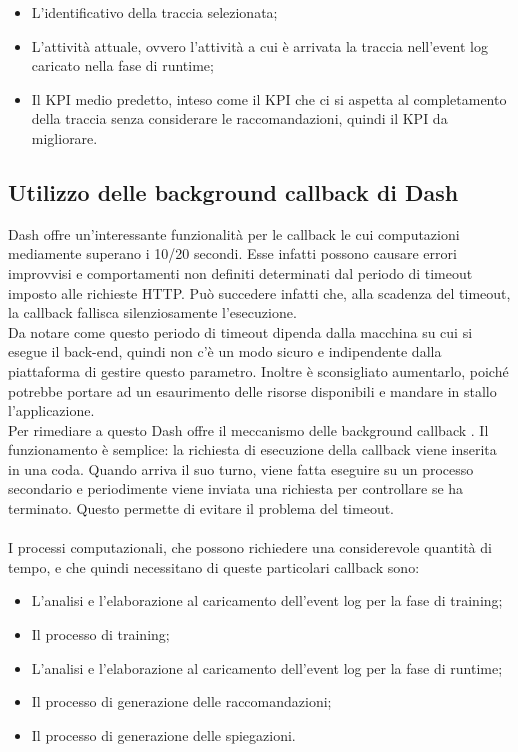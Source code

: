 \begin{itemize}
\item L'identificativo della traccia selezionata;

\item L'attività attuale, ovvero l'attività a cui è arrivata la traccia nell'event log caricato nella fase di runtime;

\item Il KPI medio predetto, inteso come il KPI che ci si aspetta al completamento della traccia senza considerare le raccomandazioni, quindi il KPI da migliorare.

\end{itemize}


\subsection{Utilizzo delle background callback di Dash}
Dash offre un'interessante funzionalità per le callback le cui computazioni mediamente superano i 10/20 secondi. Esse infatti possono causare errori improvvisi e comportamenti non definiti determinati dal periodo di timeout imposto alle richieste HTTP. Può succedere infatti che, alla scadenza del timeout, la callback fallisca silenziosamente l'esecuzione.
\\ 
Da notare come questo periodo di timeout dipenda dalla macchina su cui si esegue il back-end, quindi non c'è un modo sicuro e indipendente dalla piattaforma di gestire questo parametro. Inoltre è sconsigliato aumentarlo, poiché potrebbe portare ad un esaurimento delle risorse disponibili e mandare in stallo l'applicazione.
\\
Per rimediare a questo Dash offre il meccanismo delle background callback \cite{site:dash-background-callbacks}.
Il funzionamento è semplice: la richiesta di esecuzione della callback viene inserita in una coda. Quando arriva il suo turno, viene fatta eseguire su un processo secondario e periodimente viene inviata una richiesta per controllare se ha terminato. Questo permette di evitare il problema del timeout.
\\ \\
I processi computazionali, che possono richiedere una considerevole quantità di tempo, e che quindi necessitano di queste particolari callback sono:

\begin{itemize}
\item L'analisi e l'elaborazione al caricamento dell'event log per la fase di training;

\item Il processo di training;

\item L'analisi e l'elaborazione al caricamento dell'event log per la fase di runtime;

\item Il processo di generazione delle raccomandazioni;

\item Il processo di generazione delle spiegazioni.

\end{itemize}

